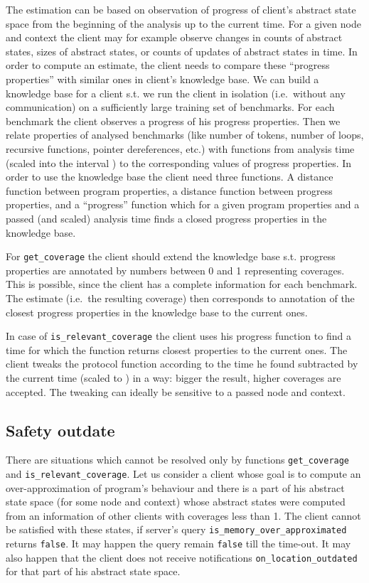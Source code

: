 \documentclass[envcountsame]{llncs}
\begin{document}
The estimation can be based on observation of progress of client's abstract
state space from the beginning of the analysis up to the current time. For a
given node and context the client may for example observe changes in counts of
abstract states, sizes of abstract states, or counts of updates of abstract
states in time. In order to compute an estimate, the client needs to
compare these ``progress properties'' with similar ones in client's knowledge
base. We can build a knowledge base for a client s.t. we run the client in
isolation (i.e.~without any communication) on a sufficiently large training set
of benchmarks. For each benchmark the client observes a progress of his progress
properties. Then we relate properties of analysed benchmarks (like number of
tokens, number of loops, recursive functions, pointer dereferences, etc.) with
functions from analysis time (scaled into the interval ) to the
corresponding values of progress properties. In order to use the knowledge base
the client need three functions. A distance function between program properties,
a distance function between progress properties, and a ``progress'' function
which for a given program properties and a passed (and scaled) analysis time
finds a closed progress properties in the knowledge base.

For \texttt{get\_coverage} the client should extend the knowledge base s.t.
progress properties are annotated by numbers between 0 and 1 representing
coverages. This is possible, since the client has a complete information for
each benchmark. The estimate (i.e.~the resulting coverage) then corresponds to
annotation of the closest progress properties in the knowledge base to the
current ones.

In case of \texttt{is\_relevant\_coverage} the client uses his progress function
to find a time for which the function returns closest properties to the current
ones. The client tweaks the protocol function according to the time he found
subtracted by the current time (scaled to ) in a way: bigger the
result, higher coverages are accepted. The tweaking can ideally be sensitive to
a passed node and context.


\subsection{Safety outdate}
\label{sec:SafetyOutdate}

There are situations which cannot be resolved only by functions
\texttt{get\_coverage} and \texttt{is\_relevant\_coverage}. Let us consider a
client whose goal is to compute an over-approximation of program's behaviour and
there is a part of his abstract state space (for some node and context) whose
abstract states were computed from an information of other clients with
coverages less than 1. The client cannot be satisfied with these states, if
server's query \texttt{is\_memory\_over\_approximated} returns \texttt{false}.
It may happen the query remain \texttt{false} till the time-out. It may also
happen that the client does not receive notifications
\texttt{on\_location\_outdated} for that part of his abstract state space.
\end{document}
